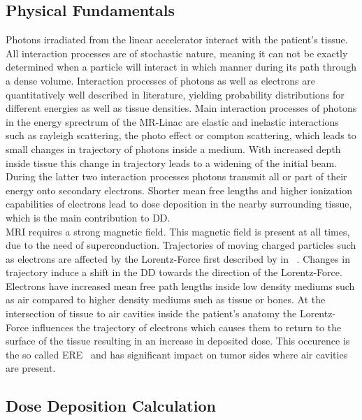 \subsection{Physical Fundamentals}

Photons irradiated from the linear accelerator interact with the patient's tissue.
All interaction processes are of stochastic nature, meaning it can not be exactly determined when a particle will interact in which manner during its path through a dense volume.
Interaction processes of photons as well as electrons are quantitatively well described in literature, yielding probability distributions for different energies as well as tissue densities.
Main interaction processes of photons in the energy sprectrum of the MR-Linac are elastic and inelastic interactions such as rayleigh scattering, the photo effect or compton scattering, which leads to small changes in trajectory of photons inside a medium.
With increased depth inside tissue this change in trajectory leads to a widening of the initial beam.
During the latter two interaction processes photons transmit all or part of their energy onto secondary electrons.
Shorter mean free lengths and higher ionization capabilities of electrons lead to dose deposition in the nearby surrounding tissue, which is the main contribution to \acs{DD}.\\
\ac{MRI} requires a strong magnetic field. 
This magnetic field is present at all times, due to the need of superconduction. 
Trajectories of moving charged particles such as electrons are affected by the Lorentz-Force first described by \citeauthor{lorentz_versuch_1937} in \citeyear{lorentz_versuch_1937}~\cite{lorentz_versuch_1937}.
Changes in trajectory induce a shift in the \acs{DD} towards the direction of the Lorentz-Force.
Electrons have increased mean free path lengths inside low density mediums such as air compared to higher density mediums such as tissue or bones.
At the intersection of tissue to air cavities inside the patient's anatomy the Lorentz-Force influences the trajectory of electrons which causes them to return to the surface of the tissue resulting in an increase in deposited dose.
This occurence is the so called \ac{ERE}~\cite{lee_using_2017} and has significant impact on tumor sides where air cavities are present.


\subsection{Dose Deposition Calculation}

